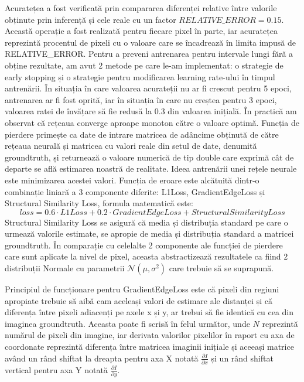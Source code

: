 \documentclass[12pt,a4paper]{report}
\begin{document}
Acuratețea a fost verificată prin compararea diferenței relative între valorile obținute prin inferență și cele
reale cu un factor $ RELATIVE\_ERROR=0.15 $. Această operație a fost realizată pentru fiecare pixel în parte, iar
acuratețea reprezintă procentul de pixeli cu o valoare care se încadrează în limita impusă de RELATIVE\_ERROR.\@
Pentru a preveni antrenarea pentru intervale lungi fără a obține rezultate, am avut 2 metode pe care le-am implementat:
o strategie de early stopping și o strategie pentru modificarea learning rate-ului în timpul antrenării. În situația în
care valoarea acurateții nu ar fi crescut pentru 5 epoci, antrenarea ar fi fost oprită, iar în situația în care nu creștea 
pentru 3 epoci, valoarea ratei de învățare să fie redusă la 0.3 din valoarea inițială. În practică am observat că rețeaua
converge aproape monoton către o valoare optimă. Funcția de pierdere primește ca date de intrare matricea de adâncime
obținută de către rețeaua neurală și matricea cu valori reale din setul de date, denumită groundtruth, și returnează o valoare
numerică de tip double care exprimă cât de departe se află estimarea noastră de realitate. Ideea antrenării unei rețele
neurale este minimizarea acestei valori. Funcția de eroare este alcătuită dintr-o combinație liniară a
3 componente diferite\cite{lossfunctionidea}: L1Loss, GradientEdgeLoss și Structural Similarity Loss, formula matematică este:
\begin{equation}
loss = 0.6 \cdot L1Loss + 0.2 \cdot GradientEdgeLoss + StructuralSimilarityLoss
\end{equation}
Structural Similarity Loss se asigură că media și distribuția standard pe care o urmează valorile estimate, se apropie
de media și distribuția standard a matricei groundtruth. În comparație cu celelalte 2 componente ale funcției de
pierdere care sunt aplicate la nivel de pixel, aceasta abstractizează rezultatele ca fiind 2 distribuții Normale
cu parametrii $ \mathcal{N}(\mu, \sigma^2) $ care trebuie să se suprapună.

Principiul de funcționare pentru GradientEdgeLoss este că pixeli din regiuni apropiate trebuie să aibă cam aceleași
valori de estimare ale distanței și că diferența între pixeli adiacenți pe axele x și y, ar trebui să fie identică
cu cea din imaginea groundtruth. Aceasta poate fi scrisă în felul următor, unde $ N $ reprezintă numărul de pixeli din
imagine, iar derivata valorilor pixelilor în raport cu axa de coordonate reprezintă diferența între matricea imaginii
inițiale și aceeași matrice având un rând shiftat la dreapta pentru axa X notată $ \frac{\partial I}{\partial x} $
și un rând shiftat vertical pentru axa Y notată $ \frac{\partial I}{\partial y} $.
 
\end{document}
